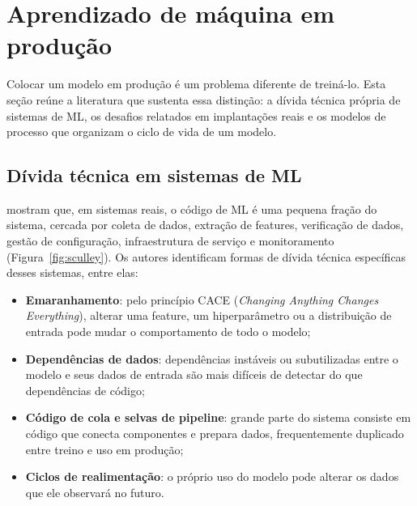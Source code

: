 \section{Aprendizado de máquina em produção}
\label{sec:ml-producao}

Colocar um modelo em produção é um problema diferente de treiná-lo. Esta seção reúne a literatura que sustenta essa distinção: a dívida técnica própria de sistemas de ML, os desafios relatados em implantações reais e os modelos de processo que organizam o ciclo de vida de um modelo.

\subsection{Dívida técnica em sistemas de ML}

 mostram que, em sistemas reais, o código de ML é uma pequena fração do sistema, cercada por coleta de dados, extração de features, verificação de dados, gestão de configuração, infraestrutura de serviço e monitoramento (Figura~\ref{fig:sculley}). Os autores identificam formas de dívida técnica específicas desses sistemas, entre elas:

\begin{itemize}
	\item \textbf{Emaranhamento}: pelo princípio CACE (\textit{Changing Anything Changes Everything}), alterar uma feature, um hiperparâmetro ou a distribuição de entrada pode mudar o comportamento de todo o modelo;
	\item \textbf{Dependências de dados}: dependências instáveis ou subutilizadas entre o modelo e seus dados de entrada são mais difíceis de detectar do que dependências de código;
	\item \textbf{Código de cola e selvas de pipeline}: grande parte do sistema consiste em código que conecta componentes e prepara dados, frequentemente duplicado entre treino e uso em produção;
	\item \textbf{Ciclos de realimentação}: o próprio uso do modelo pode alterar os dados que ele observará no futuro.
\end{itemize}

